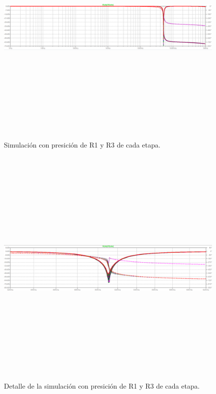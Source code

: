 \begin{figure}[H] %
	\centering	\includegraphics[width=12cm,height=12cm,keepaspectratio]{../EJ4/graficos/ATENUACION.png}
	\caption{Simulaci\'on con presici\'on de R1 y R3 de cada etapa.}
	\label{sim_total}
\end{figure}

\begin{figure}[H] %
	\centering	\includegraphics[width=12cm,height=12cm,keepaspectratio]{../EJ4/graficos/ATENUACION_ZOOM.png}
	\caption{Detalle de la simulaci\'on con presici\'on de R1 y R3 de cada etapa.}
	\label{sim_total_detalle}
\end{figure}


